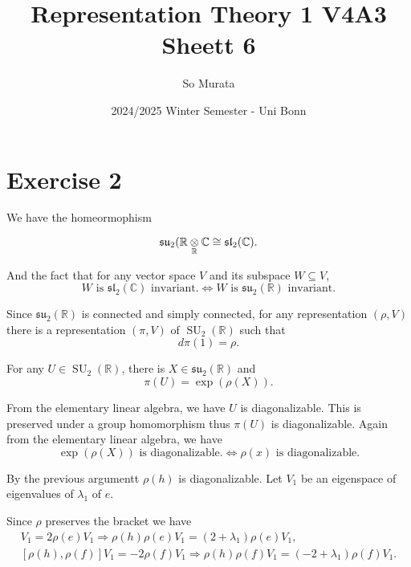 \documentclass{article}
\title{Representation Theory 1 V4A3 Sheett 6}
\author{So Murata}
\date{2024/2025 Winter Semester - Uni Bonn}
\numberwithin{equation}{section}
\DeclareMathOperator{\SU}{SU}
\newcommand{\tens}[1]{%
  \mathbin{\mathop{\otimes}\displaylimits_{#1}}%
}
\begin{document}
\maketitle

\section*{Exercise 2}

We have the homeormophism

\begin{equation*}
\mathfrak{su}_2(\mathbb{R}\tens{\mathbb{R}}\mathbb{C} \cong \mathfrak{sl}_2(\mathbb{C}).
\end{equation*}

And the fact that for any vector space $V$ and its subspace $W\subseteq V$,
\begin{equation*}
W\text{ is $\mathfrak{sl}_2(\mathbb{C})$ invariant.}\Leftrightarrow W\text{ is $\mathfrak{su}_2(\mathbb{R})$ invariant.}
\end{equation*}

Since $\mathfrak{su}_2(\mathbb{R})$ is connected and simply connected, for any representation $(\rho,V)$ there is a representation $(\pi,V)$ of $\SU_2(\mathbb{R})$ such that 
\begin{equation*}
d\pi(1) =\rho.
\end{equation*}

For any $U\in\SU_2(\mathbb{R})$, there is $X\in\mathfrak{su}_2(\mathbb{R})$ and 
\begin{equation*}
\pi(U) = \exp(\rho(X)).
\end{equation*}

From the elementary linear algebra, we have $U$ is diagonalizable. This is preserved under a group homomorphism thus $\pi(U)$
is diagonalizable. Again from the elementary linear algebra, we have
\begin{equation*}
\exp(\rho(X))\text{ is diagonalizable.}\Leftrightarrow \rho(x)\text{ is diagonalizable.}
\end{equation*}

By the previous argumentt $\rho(h)$ is diagonalizable. Let $V_1$ be an eigenspace of eigenvalues of $\lambda_1$ of $e$.

Since $\rho$ preserves the bracket we have
\begin{align*}
[\rho(h),\rho(e)]V_1 = 2\rho(e)V_1\Rightarrow \rho(h)\rho(e)V_1 = (2+\lambda_1)\rho(e)V_1, \\
[\rho(h),\rho(f)]V_1 = -2\rho(f)V_1\Rightarrow \rho(h)\rho(f)V_1 = (-2+\lambda_1)\rho(f)V_1. 
\end{align*}
\end{document}
